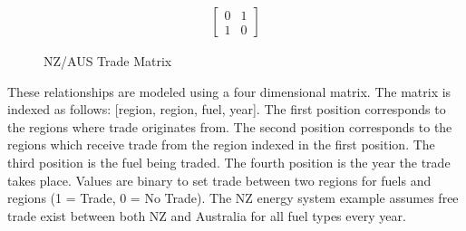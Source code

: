 \documentclass[12pt]{article}
\begin{document}
\begin{figure}
	\begin{align*}
	\begin{bmatrix}
		0 & 1 \\
		1 & 0 
	\end{bmatrix}
	\end{align*}
	\caption{NZ/AUS Trade Matrix}
	\label{fig:TR}
\end{figure}
These relationships are modeled using a four dimensional matrix. The matrix is indexed as follows: [region, region, fuel, year].
The first position corresponds to the regions where trade originates from. The second position corresponds to the regions which receive trade from the region indexed in the first position.
The third position is the fuel being traded. The fourth position is the year the trade takes place.
Values are binary to set trade between two regions for fuels and regions (1 = Trade, 0 = No Trade).
The NZ energy system example assumes free trade exist between both NZ and Australia for all fuel types every year.
\end{document}

